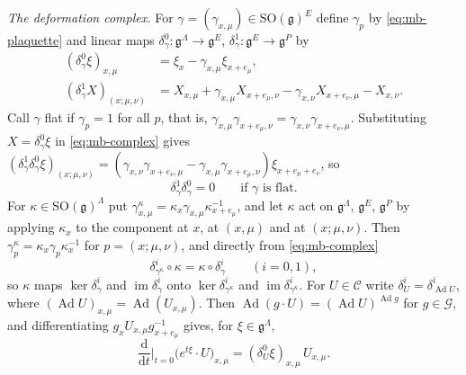 \documentclass[11pt,a4paper]{amsart}
\theoremstyle{definition}
\theoremstyle{remark}
\numberwithin{equation}{section}
\begin{document}
\emph{The deformation complex.} For $\gamma=(\gamma_{x,\mu})\in\mathrm{SO}(\mathfrak g)^E$ define $\gamma_p$ by \eqref{eq:mb-plaquette} and linear maps $\delta^0_\gamma\colon\mathfrak g^\Lambda\to\mathfrak g^E$, $\delta^1_\gamma\colon\mathfrak g^E\to\mathfrak g^P$ by
\begin{equation}\label{eq:mb-complex}
\begin{aligned}
(\delta^0_\gamma\xi)_{x,\mu}&=\xi_x-\gamma_{x,\mu}\xi_{x+e_\mu},\\
(\delta^1_\gamma X)_{(x;\mu,\nu)}&=X_{x,\mu}+\gamma_{x,\mu}X_{x+e_\mu,\nu}-\gamma_{x,\nu}X_{x+e_\nu,\mu}-X_{x,\nu}.
\end{aligned}
\end{equation}
Call $\gamma$ flat if $\gamma_p=1$ for all $p$, that is, $\gamma_{x,\mu}\gamma_{x+e_\mu,\nu}=\gamma_{x,\nu}\gamma_{x+e_\nu,\mu}$. Substituting $X=\delta^0_\gamma\xi$ in \eqref{eq:mb-complex} gives $(\delta^1_\gamma\delta^0_\gamma\xi)_{(x;\mu,\nu)}=(\gamma_{x,\nu}\gamma_{x+e_\nu,\mu}-\gamma_{x,\mu}\gamma_{x+e_\mu,\nu})\xi_{x+e_\mu+e_\nu}$, so
\begin{equation}\label{eq:mb-dd}
\delta^1_\gamma\delta^0_\gamma=0\qquad\text{if $\gamma$ is flat.}
\end{equation}
For $\kappa\in\mathrm{SO}(\mathfrak g)^\Lambda$ put $\gamma^\kappa_{x,\mu}=\kappa_x\gamma_{x,\mu}\kappa_{x+e_\mu}^{-1}$, and let $\kappa$ act on $\mathfrak g^\Lambda$, $\mathfrak g^E$, $\mathfrak g^P$ by applying $\kappa_x$ to the component at $x$, at $(x,\mu)$ and at $(x;\mu,\nu)$. Then $\gamma^\kappa_p=\kappa_x\gamma_p\kappa_x^{-1}$ for $p=(x;\mu,\nu)$, and directly from \eqref{eq:mb-complex}
\begin{equation}\label{eq:mb-covariance}
\delta^i_{\gamma^\kappa}\circ\kappa=\kappa\circ\delta^i_\gamma\qquad(i=0,1),
\end{equation}
so $\kappa$ maps $\ker\delta^i_\gamma$ and $\operatorname{im}\delta^i_\gamma$ onto $\ker\delta^i_{\gamma^\kappa}$ and $\operatorname{im}\delta^i_{\gamma^\kappa}$. For $U\in\mathcal C$ write $\delta^i_U=\delta^i_{\operatorname{Ad}U}$, where $(\operatorname{Ad}U)_{x,\mu}=\operatorname{Ad}(U_{x,\mu})$. Then $\operatorname{Ad}(g\cdot U)=(\operatorname{Ad}U)^{\operatorname{Ad}g}$ for $g\in\mathcal G$, and differentiating $g_xU_{x,\mu}g_{x+e_\mu}^{-1}$ gives, for $\xi\in\mathfrak g^\Lambda$,
\begin{equation}\label{eq:mb-orbit}
\frac{\mathrm d}{\mathrm dt}\Big|_{t=0}\bigl(e^{t\xi}\cdot U\bigr)_{x,\mu}=(\delta^0_U\xi)_{x,\mu}\,U_{x,\mu}.
\end{equation}
\end{document}
